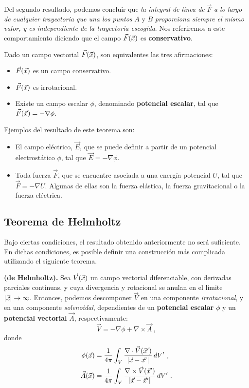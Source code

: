 Del segundo resultado, podemos concluir que \emph{la integral de línea de} $\vec{F}$ \emph{a lo largo de cualquier trayectoria que una los puntos} $A$ y $B$ \emph{proporciona siempre el mismo valor, y es independiente de la trayectoria escogida}. Nos referiremos a este comportamiento diciendo que el campo $\vec{F}(\vec{x})$ es \textbf{conservativo}.

\begin{teorema}
    Dado un campo vectorial $\vec{F}(\vec{x})$, son equivalentes las tres afirmaciones:
    \begin{itemize}
        \item $\vec{F}(\vec{x})$ es un campo conservativo.
        \item $\vec{F}(\vec{x})$ es irrotacional.
        \item Existe un campo escalar $\phi$, denominado \textbf{potencial escalar}, tal que $\vec{F}(\vec{x}) = - \nabla \phi$.
    \end{itemize}
\end{teorema}

Ejemplos del resultado de este teorema son:
\begin{itemize}
    \item El campo eléctrico, $\vec{E}$, que se puede definir a partir de un potencial electrostático $\phi$, tal que $\vec{E} = - \nabla \phi$.
    \item Toda fuerza $\vec{F}$, que se encuentre asociada a una energía potencial $U$, tal que $\vec{F} = - \nabla U$. Algunas de ellas son la fuerza elástica, la fuerza gravitacional o la fuerza eléctrica.
\end{itemize}

\subsection{Teorema de Helmholtz}

Bajo ciertas condiciones, el resultado obtenido anteriormente no será suficiente. En dichas condiciones, es posible definir una construcción más complicada utilizando el siguiente teorema.

\begin{teorema}{\textbf{(de Helmholtz).}}
    Sea $\vec{V}(\vec{x})$ un campo vectorial diferenciable, con derivadas parciales continuas, y cuya divergencia y rotacional se anulan en el límite $|\vec{x}| \to \infty$. Entonces, podemos descomponer $\vec{V}$ en una componente \emph{irrotacional}, y en una componente \emph{solenoidal}, dependientes de un \textbf{potencial escalar} $\phi$ y un \textbf{potencial vectorial} $\vec{A}$, respectivamente:
    \begin{equation}
        \vec{V} = -\nabla \phi + \nabla \times \vec{A} \ ,
    \end{equation}
    donde
    \begin{align}
        \phi(\vec{x})    & = \frac{1}{4\pi} \int_V \frac{\nabla \cdot \vec{V}(\vec{x}')}{|\vec{x}-\vec{x}'|} \, dV' \ , \\
        \vec{A}(\vec{x}) & = \frac{1}{4\pi} \int_V \frac{\nabla \times \vec{V}(\vec{x}')}{|\vec{x}-\vec{x}'|} \, dV' \ . 
    \end{align}
\end{teorema}


